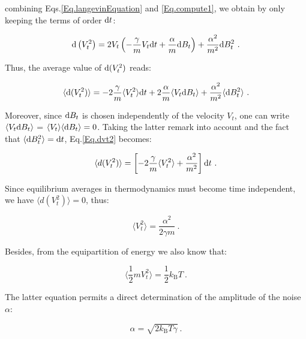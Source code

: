 combining Eqs.\ref{Eq.langevinEquation} and \ref{Eq.compute1}, we obtain by only keeping  the terms of order $\textnormal{d}t$:

\begin{equation}
	\textnormal{d}\left(V_t^2\right) = 2V_t\left( -\frac{\gamma}{m}V_t\textnormal{d}t + \frac{\alpha}{m}\textnormal{d}B_t  \right) + \frac{\alpha^2}{m^2}\textnormal{d}B_t ^2 ~. 
\end{equation}

Thus, the average value of $ \textnormal{d}(V_t ^2)$ reads:

\begin{equation}
	\langle \textnormal{d}(V_t ^2)\rangle = -2 \frac{\gamma}{m} \langle V_t ^2 \rangle \textnormal dt + 2 \frac{\alpha}{m} \langle V_t \textnormal{d}B_t \rangle + \frac{\alpha^2}{m^2} \langle \textnormal{d}B_t ^2 \rangle~.
	\label{Eq.dvt2}
\end{equation} 

Moreover, since $\textnormal{d}B_t$ is chosen independently of the velocity $V_t$, one can write $\langle V_t \textnormal{d}B_t \rangle $ = $\langle V_t \rangle \langle \textnormal{d}B_t \rangle  =0 $. Taking the latter remark into account and the fact that $\langle \textnormal{d}B_t ^2\rangle = \textnormal{d}t $, Eq.\ref{Eq.dvt2} becomes:

\begin{equation}
	\langle d(V_t^2) \rangle = \left[-2 \frac{\gamma}{m} \langle V_t ^2 \rangle + \frac{\alpha^2}{m^2}\right]\textnormal{d}t~.
\end{equation}

Since equilibrium averages in thermodynamics must become time independent, we have $\langle d(V_t^2) \rangle = 0$, thus:

\begin{equation}
	\langle V_t ^2\rangle = \frac{\alpha ^2}{2 \gamma m}~. 
\end{equation}

Besides, from the equipartition of energy we also know that:

\begin{equation}
	\langle \frac{1}{2} m V_t ^2 \rangle  = \frac{1}{2} k_\mathrm{B} T~.
\end{equation}

The latter equation permits a direct determination of the amplitude of the noise $\alpha$: 

\begin{equation}
	\alpha = \sqrt{2k_\mathrm{B}T \gamma}~.
\end{equation}

